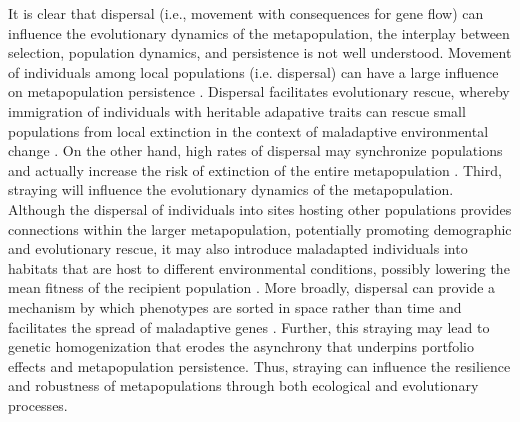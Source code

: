 \documentclass[twocolumn,preprintnumbers,amsmath,amssymb,superscriptaddress]{revtex4}
\begin{document}
It is clear that dispersal (i.e., movement with consequences for gene flow) can influence the evolutionary dynamics of the metapopulation, the interplay between selection, population dynamics, and persistence is not well understood.
Movement of individuals among local populations (i.e. dispersal) can have a large influence on metapopulation persistence \cite{MilnerGulland:2011vm}. 
Dispersal facilitates evolutionary rescue, whereby immigration of individuals with heritable adapative traits can rescue small populations from local extinction in the context of maladaptive environmental change \cite{Bell:2011ki,Carlson:2014is}.
On the other hand, high rates of dispersal may synchronize populations and actually increase the risk of extinction of the entire metapopulation \cite{Earn:2000fm}. 
Third, straying will influence the evolutionary dynamics of the metapopulation.
Although the dispersal of individuals into sites hosting other populations provides connections within the larger metapopulation, potentially promoting demographic and evolutionary rescue, it may also introduce maladapted individuals into habitats that are host to different environmental conditions, possibly lowering the mean fitness of the recipient population \cite{Muhlfeld:2014hs}. 
More broadly, dispersal can provide a mechanism by which phenotypes are sorted in space rather than time and facilitates the spread of maladaptive genes \cite{Lowe:2015ft}.
Further, this straying may lead to genetic homogenization that erodes the asynchrony that underpins portfolio effects and metapopulation persistence. 
Thus, straying can influence the resilience and robustness of metapopulations through both ecological and evolutionary processes.
\end{document}
